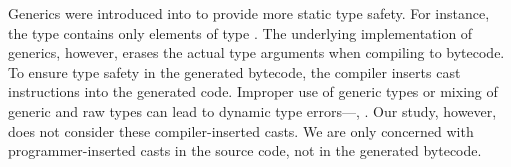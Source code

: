 Generics were introduced into \java{} to provide more static type safety.
For instance, the type  contains only elements of type .
The underlying implementation of generics, however, erases the actual type
arguments when compiling to bytecode. To ensure type safety in the generated
bytecode, the compiler inserts cast instructions into the generated code.
Improper use of generic types or mixing of generic and raw types can lead
to dynamic type errors---\ie, .
Our study, however, does not consider these compiler-inserted casts. We are only concerned with
programmer-inserted casts in the source code, not in the generated bytecode.
